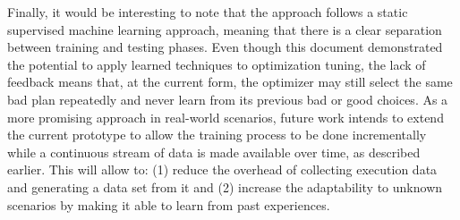 Finally, it would be interesting to note that the approach follows a static supervised machine learning approach, meaning that there is a clear separation between training and testing phases. Even though this document demonstrated the potential to apply learned techniques to optimization tuning, the lack of feedback means that, at the current form, the optimizer may still select the same bad plan repeatedly and never learn from its previous bad or good choices. As a more promising approach in real-world scenarios, future work intends to extend the current prototype to allow the training process to be done incrementally while a continuous stream of data is made available over time, as described earlier. This will allow to: (1) reduce the overhead of collecting execution data and generating a data set from it and (2) increase the adaptability to unknown scenarios by making it able to learn from past experiences.